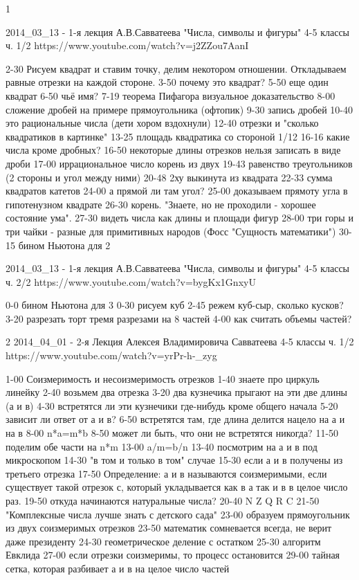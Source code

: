1 

2014_03_13 - 1-я лекция А.В.Савватеева "Числа, символы и фигуры" 4-5 классы ч. 1/2
https://www.youtube.com/watch?v=j2ZZou7AanI

2-30 Рисуем квадрат и ставим точку, делим некотором отношении. Откладываем равные отрезки на каждой стороне.
3-50 почему это квадрат?
5-50 еще один квадрат
6-50 чьё имя?
7-19 теорема Пифагора визуальное доказательство
8-00 сложение дробей на примере прямоугольника (офтопик)
9-30 запись дробей
10-40 это рациональные числа (дети хором вздохнули)
12-40 отрезки и "сколько квадратиков в картинке"
13-25 площадь квадратика со стороной 1/12
16-16 какие числа кроме дробных?
16-50 некоторые длины отрезков нельзя записать в виде дроби
17-00 иррациональное число корень из двух
19-43 равенство треугольников (2 стороны и угол между ними)
20-48 2ху выкинута из квадрата
22-33 сумма квадратов катетов
24-00 а прямой ли там угол?
25-00 доказываем прямоту угла в гипотенузном квадрате
26-30 корень. "Знаете, но не проходили - хорошее состояние ума".
27-30 видеть числа как длины и площади фигур
28-00 три горы и три чайки - разные для примитивных народов (Фосс "Сущность математики")
30-15 бином Ньютона для 2


2014_03_13 - 1-я лекция А.В.Савватеева "Числа, символы и фигуры" 4-5 классы ч. 2/2
https://www.youtube.com/watch?v=bygKx1GnxyU

0-0 бином Ньютона для 3
0-30 рисуем куб
2-45 режем куб-сыр, сколько кусков?
3-20 разрезать торт тремя разрезами на 8 частей
4-00 как считать объемы частей?

2
2014_04_01 - 2-я Лекция Алексея Владимировича Савватеева 4-5 классы ч. 1/2
https://www.youtube.com/watch?v=yrPr-h-_zyg

1-00 Соизмеримость и несоизмеримость отрезков
1-40 знаете про циркуль линейку
2-40 возьмем два отрезка
3-20 два кузнечика прыгают на эти две длины (а и в)
4-30 встретятся ли эти кузнечики где-нибудь кроме общего начала
5-20 зависит ли ответ от а и в?
6-50 встретятся там, где длина делится нацело на а и на в
8-00 n*a=m*b
8-50 может ли быть, что они не встретятся никогда?
11-50 поделим обе части на n*m
13-00 a/m=b/n
13-40 посмотрим на а и в под микроскопом
14-30 "в том и только в том" случае
15-30 если а и в получены из третьего отрезка
17-50 Определение: а и в называются соизмеримыми, если существует такой 
          отрезок с, который укладывается как в а так и в в целое число раз.
19-50 откуда начинаются натуральные числа?
20-40 N Z Q R C
21-50 "Комплексные числа лучше знать с детского сада"
23-00 образуем прямоугольник из двух соизмеримых отрезков
23-50 математик сомневается всегда, не верит даже президенту
24-30 геометрическое деление с остатком
25-30 алгоритм Евклида
27-00 если отрезки соизмеримы, то процесс остановится
29-00 тайная сетка, которая разбивает а и в на целое число частей

